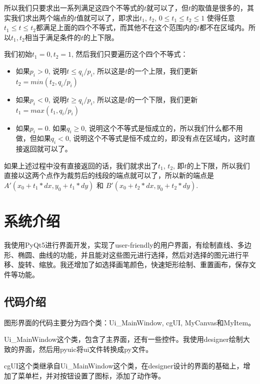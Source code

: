 \documentclass[a4paper,UTF8]{article}
\theoremstyle{definition}
\begin{document}
    所以我们只要求出一系列满足这四个不等式的$t$就可以了，但$t$的取值是很多的，其实我们求出两个端点的$t$值就可以了，即求出$t_1$, $t_2$, $0 \le t_1 \le t_2 \le 1$ 使得任意$ t_1 \le t \le t_2$都满足上面的四个不等式，而其他不在这个范围内的$t$都不在区域内。所以$t_1, t_2$相当于满足条件的$t$的上下限。



    我们初始$t_1 =0, t_2  =1$, 然后我们只要遍历这个四个不等式：
        \begin{itemize}
            \item 如果$p_i >0$, 说明$t \le q_i /p_i $, 所以这是$t$的一个上限，我们更新$t_2 = min(t_2, q_i /p_i)$ 
            \item 如果$p_i <0$, 说明$t \ge q_i/p_i$, 所以这是$t$的一个下限，我们更新$t_1 = max(t_1, q_i/p_i)$
            \item 如果$p_i = 0$. 如果$q_i \ge  0$, 说明这个不等式是恒成立的，所以我们什么都不用做，但如果$q_i < 0$, 说明这个不等式是恒不成立的，即没有点在区域内，这时直接返回就可以了。
        \end{itemize}

    如果上述过程中没有直接返回的话，我们就求出了$t_1$, $t_2$, 即$t$的上下限，所以我们直接以这两个点作为裁剪后的线段的端点就可以了，所以新的端点是$A'(x_0 + t_1*dx, y_0 + t_1*dy)$ 和 $B'(x_0 + t_2*dx, y_0 + t_2*dy)$.





		
\section{系统介绍}

我使用PyQt5进行界面开发，实现了user-friendly的用户界面，有绘制直线、多边形、椭圆、曲线的功能，并且能对这些图元进行选择，然后对选择的图元进行平移、旋转、缩放。我还增加了如选择画笔颜色，快速矩形绘制、重置画布，保存文件等功能。


\subsection{代码介绍}


图形界面的代码主要分为四个类：Ui\_MainWindow, cgUI, MyCanvas和MyItem。

Ui\_MainWindow这个类，包含了主界面，还有一些控件。我使用designer绘制大致的界面，然后用pyuic将ui文件转换成py文件。

cgUI这个类继承自Ui\_MainWindow这个类，在designer设计的界面的基础上，增加了菜单栏，并对按钮设置了图标，添加了动作等。
\end{document}
